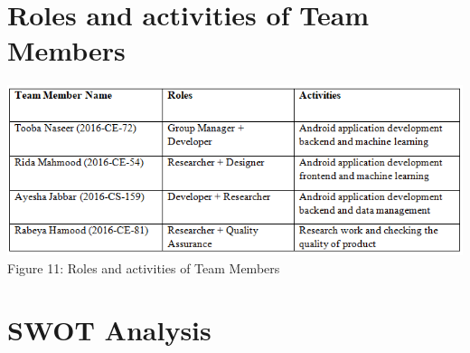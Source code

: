 \documentclass{article}
\begin{document}
\section{Roles and activities of Team Members}
\begin{center}
\includegraphics[scale=0.8]{table5}
\\Figure 11: Roles and activities of Team Members
\end{center}
\section{SWOT Analysis}
\end{document}
